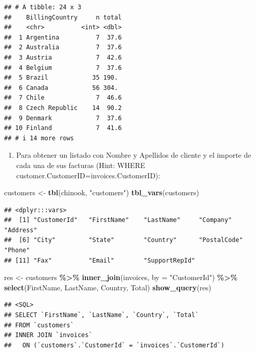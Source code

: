 \documentclass[
]{book}
\newenvironment{Shaded}{\begin{snugshade}}{\end{snugshade}}
\newcommand{\AttributeTok}[1]{\textcolor[rgb]{0.13,0.29,0.53}{#1}}
\newcommand{\FunctionTok}[1]{\textcolor[rgb]{0.13,0.29,0.53}{\textbf{#1}}}
\newcommand{\NormalTok}[1]{#1}
\newcommand{\OtherTok}[1]{\textcolor[rgb]{0.56,0.35,0.01}{#1}}
\newcommand{\SpecialCharTok}[1]{\textcolor[rgb]{0.81,0.36,0.00}{\textbf{#1}}}
\newcommand{\StringTok}[1]{\textcolor[rgb]{0.31,0.60,0.02}{#1}}
\providecommand{\tightlist}{%
  \setlength{\itemsep}{0pt}\setlength{\parskip}{0pt}}
\begin{document}
\begin{verbatim}
## # A tibble: 24 x 3
##    BillingCountry     n total
##    <chr>          <int> <dbl>
##  1 Argentina          7  37.6
##  2 Australia          7  37.6
##  3 Austria            7  42.6
##  4 Belgium            7  37.6
##  5 Brazil            35 190. 
##  6 Canada            56 304. 
##  7 Chile              7  46.6
##  8 Czech Republic    14  90.2
##  9 Denmark            7  37.6
## 10 Finland            7  41.6
## # i 14 more rows
\end{verbatim}

\begin{enumerate}
\def\labelenumi{\arabic{enumi}.}
\setcounter{enumi}{3}
\tightlist
\item
  Para obtener un listado con Nombre y Apellidos de cliente y el importe de cada una de sus facturas (Hint: WHERE customer.CustomerID=invoices.CustomerID):
\end{enumerate}

\begin{Shaded}
\begin{Highlighting}[]
\NormalTok{customers }\OtherTok{\textless{}{-}} \FunctionTok{tbl}\NormalTok{(chinook, }\StringTok{"customers"}\NormalTok{)}
\FunctionTok{tbl\_vars}\NormalTok{(customers) }
\end{Highlighting}
\end{Shaded}

\begin{verbatim}
## <dplyr:::vars>
##  [1] "CustomerId"   "FirstName"    "LastName"     "Company"      "Address"     
##  [6] "City"         "State"        "Country"      "PostalCode"   "Phone"       
## [11] "Fax"          "Email"        "SupportRepId"
\end{verbatim}

\begin{Shaded}
\begin{Highlighting}[]
\NormalTok{res }\OtherTok{\textless{}{-}}\NormalTok{ customers }\SpecialCharTok{\%\textgreater{}\%} 
  \FunctionTok{inner\_join}\NormalTok{(invoices, }\AttributeTok{by =} \StringTok{"CustomerId"}\NormalTok{) }\SpecialCharTok{\%\textgreater{}\%} 
  \FunctionTok{select}\NormalTok{(FirstName, LastName, Country, Total) }
\FunctionTok{show\_query}\NormalTok{(res)}
\end{Highlighting}
\end{Shaded}

\begin{verbatim}
## <SQL>
## SELECT `FirstName`, `LastName`, `Country`, `Total`
## FROM `customers`
## INNER JOIN `invoices`
##   ON (`customers`.`CustomerId` = `invoices`.`CustomerId`)
\end{verbatim}
\end{document}
